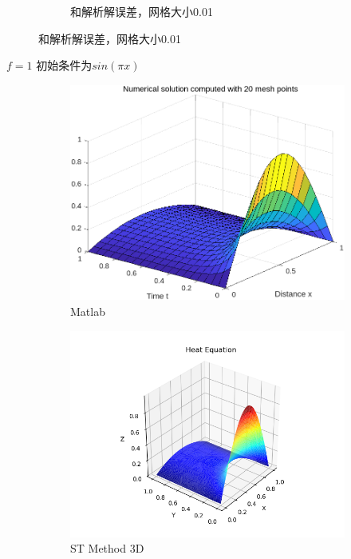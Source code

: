 \begin{figure}[H]
\begin{subfigure}{0.33\textwidth}
        \caption{和解析解误差，网格大小0.01}
    \end{subfigure} 
\end{figure} 

$f=1$ 初始条件为$sin(\pi x)$
\begin{figure}[H]
    \centering  
    \begin{subfigure}{0.33\textwidth}  
        \centering  
        \includegraphics[width=0.9\linewidth]{./pics/final/spacetime/regular/matlabf1.png}  
        \caption{Matlab}
    \end{subfigure}  
    \begin{subfigure}{0.33\textwidth}  
        \centering  
        \includegraphics[width=0.9\linewidth]{./pics/final/spacetime/regular/f1.png}  
        \caption{ST Method 3D}  
    \end{subfigure}%
    \begin{subfigure}{0.33\textwidth}  

\end{subfigure}
\end{figure}
